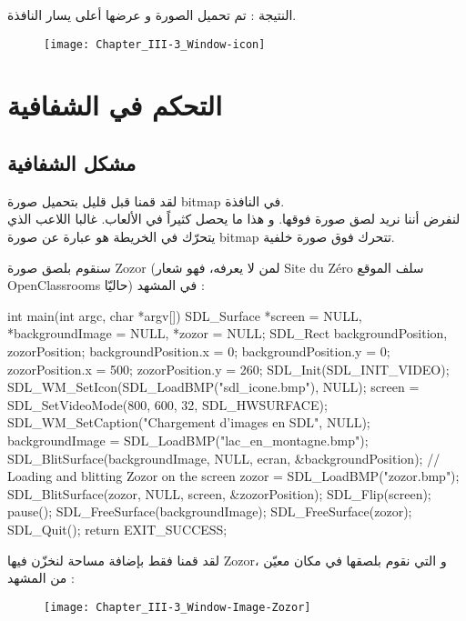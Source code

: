 النتيجة : تم تحميل الصورة و عرضها أعلى يسار النافذة.

\begin{figure}[H]
	\centering
	\texttt{[image: Chapter\_III-3\_Window-icon]}
\end{figure}

\section{التحكم في الشفافية}

\subsection{مشكل الشفافية}

لقد قمنا قبل قليل بتحميل صورة 
\textenglish{bitmap}
في النافذة.\\
لنفرض أننا نريد لصق صورة فوقها. و هذا ما يحصل كثيراً في الألعاب. غالبا اللاعب الذي يتحرّك في الخريطة هو عبارة عن صورة 
\textenglish{bitmap}
تتحرك فوق صورة خلفية.

سنقوم بلصق صورة
\textenglish{Zozor}
(لمن لا يعرفه، فهو شعار
\textenglish{Site du Zéro}
سلف الموقع 
\textenglish{OpenClassrooms}
حاليّا) في المشهد :

\begin{Csource}
int main(int argc, char *argv[])
{
	SDL_Surface *screen = NULL, *backgroundImage = NULL, *zozor = NULL;
	SDL_Rect backgroundPosition, zozorPosition;
	backgroundPosition.x = 0;
	backgroundPosition.y = 0;
	zozorPosition.x = 500;
	zozorPosition.y = 260;
	SDL_Init(SDL_INIT_VIDEO);
	SDL_WM_SetIcon(SDL_LoadBMP("sdl_icone.bmp"), NULL);
	screen = SDL_SetVideoMode(800, 600, 32, SDL_HWSURFACE);
	SDL_WM_SetCaption("Chargement d'images en SDL", NULL);
	backgroundImage = SDL_LoadBMP("lac_en_montagne.bmp");
	SDL_BlitSurface(backgroundImage, NULL, ecran, &backgroundPosition);
	// Loading and blitting Zozor on the screen
	zozor = SDL_LoadBMP("zozor.bmp");
	SDL_BlitSurface(zozor, NULL, screen, &zozorPosition);
	SDL_Flip(screen);
	pause();
	SDL_FreeSurface(backgroundImage);
	SDL_FreeSurface(zozor);
	SDL_Quit();
	return EXIT_SUCCESS;
}
\end{Csource}

لقد قمنا فقط بإضافة مساحة لنخزّن فيها 
\textenglish{Zozor}،
و التي نقوم بلصقها في مكان معيّن من المشهد :

\begin{figure}[H]
	\centering
	\texttt{[image: Chapter\_III-3\_Window-Image-Zozor]}
\end{figure}


